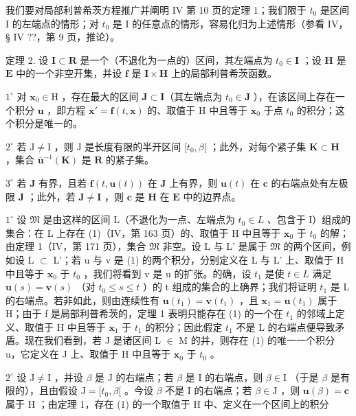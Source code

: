 我们要对局部利普希茨方程推广并阐明 IV 第 10 页的定理 1；我们限于 \(t_0\) 是区间 I 的左端点的情形；对 \(t_0\) 是 I 的任意点的情形，容易化归为上述情形（参看 IV，§ IV ??，第 9 页，推论）。

定理 2. 设 \(\mathbf{I} \subset \mathbf{R}\) 是一个（不退化为一点的）区间，其左端点为 \(t_0 \in \mathbf{I}\) ；设 \(\mathbf{H}\) 是 \(\mathbf{E}\) 中的一个非空开集，并设 \(\mathbf{f}\) 是 \(\mathbf{I} \times \mathbf{H}\) 上的局部利普希茨函数。

\(1^{\circ}\) 对 \(\mathbf{x}_0\in \mathrm{H}\) ，存在最大的区间 \(\mathbf{J}\subset \mathbf{I}\)（其左端点为 \(t_0\in \mathbf{J}\) ），在该区间上存在一个积分 \(\mathbf{u}\) ，即方程 \(\mathbf{x}' = \mathbf{f}(t,\mathbf{x})\) 的、取值于 H 中且等于 \(\mathbf{x}_0\) 于点 \(t_0\) 的积分；这个积分是唯一的。

\(2^{\circ}\) 若 \(\mathrm{J} \neq \mathrm{I}\) ，则 \(\mathrm{J}\) 是长度有限的半开区间 \([t_0, \beta[\) ；此外，对每个紧子集 \(\mathbf{K} \subset \mathbf{H}\) ，集合 \(\overline{\mathbf{u}}^{-1}(\mathbf{K})\) 是 \(\mathbf{R}\) 的紧子集。

\(3^{\circ}\) 若 \(\mathbf{J}\) 有界，且若 \(\mathbf{f}(t,\mathbf{u}(t))\) 在 \(\mathbf{J}\) 上有界，则 \(\mathbf{u}(t)\) 在 \(\mathbf{c}\) 的右端点处有左极限 \(\mathbf{J}\) ；此外，若 \(\mathbf{J} \neq \mathbf{I}\) ，则 \(\mathbf{c}\) 是 \(\mathbf{H}\) 在 \(\mathbf{E}\) 中的边界点。

\(1^{\circ}\) 设 \(\mathfrak{M}\) 是由这样的区间 L（不退化为一点、左端点为 \(t_0 \in L\) 、包含于 I）组成的集合：在 L 上存在 (1)（IV，第 163 页）的、取值于 H 中且等于 \(\mathbf{x}_0\) 于 \(t_0\) 的解；由定理 1（IV，第 171 页），集合 \(\mathfrak{M}\) 非空。设 L 与 L' 是属于 \(\mathfrak{M}\) 的两个区间，例如设 L \(\subset\) L'；若 u 与 v 是 (1) 的两个积分，分别定义在 L 与 L' 上、取值于 H 中且等于 \(\mathbf{x}_0\) 于 \(t_0\) ，我们将看到 v 是 u 的扩张。的确，设 \(t_1\) 是使 \(t \in L\) 满足 \(\mathbf{u}(s) = \mathbf{v}(s)\) （对 \(t_0 \leqslant s \leqslant t\) ）的 t 组成的集合的上确界；我们将证明 \(t_1\) 是 L 的右端点。若非如此，则由连续性有 \(\mathbf{u}(t_1) = \mathbf{v}(t_1)\) ，且 \(\mathbf{x}_1 = \mathbf{u}(t_1)\) 属于 H；由于 f 是局部利普希茨的，定理 1 表明只能存在 (1) 的一个在 \(t_1\) 的邻域上定义、取值于 H 中且等于 \(\mathbf{x}_1\) 于 \(t_1\) 的积分；因此假定 \(t_1\) 不是 L 的右端点便导致矛盾。现在我们看到，若 J 是诸区间 L \(\in\) M 的并，则存在 (1) 的唯一一个积分 u，它定义在 J 上、取值于 H 中且等于 \(\mathbf{x}_0\) 于 \(t_0\) 。

\(2^{\circ}\) 设 \(\mathrm{J} \neq \mathrm{I}\) ，并设 \(\beta\) 是 \(\mathrm{J}\) 的右端点；若 \(\beta\) 是 \(\mathrm{I}\) 的右端点，则 \(\beta \in \mathrm{I}\) （于是 \(\beta\) 是有限的），且由假设 \(\mathrm{J} = [t_0, \beta[\) 。今设 \(\beta\) 不是 \(\mathrm{I}\) 的右端点；若 \(\beta \in \mathrm{J}\) ，则 \(\mathbf{u}(\beta) = \mathbf{c}\) 属于 \(\mathrm{H}\) ；由定理 1，存在 (1) 的一个取值于 \(\mathrm{H}\) 中、定义在一个区间上的积分

